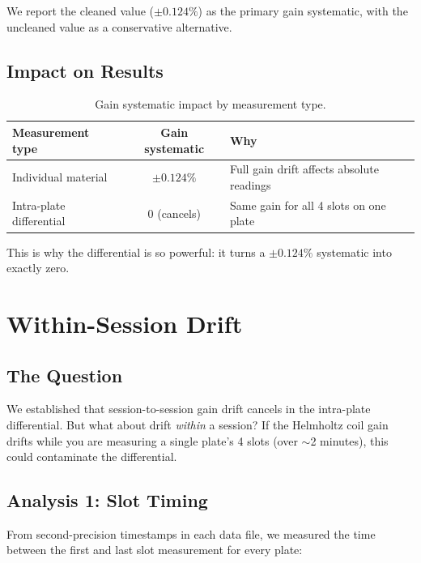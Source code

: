 \documentclass[11pt,letterpaper]{article}
\begin{document}
We report the cleaned value ($\pm 0.124\%$) as the primary gain systematic, with
the uncleaned value as a conservative alternative.

\subsection{Impact on Results}

\begin{table}[htbp]
\centering
\caption{Gain systematic impact by measurement type.}
\label{tab:gain-impact}
\begin{tabular}{@{}lcp{6cm}@{}}
\toprule
Measurement type & Gain systematic & Why \\
\midrule
Individual material       & $\pm 0.124\%$     & Full gain drift affects absolute readings \\
Intra-plate differential  & 0 (cancels)       & Same gain for all 4 slots on one plate \\
\bottomrule
\end{tabular}
\end{table}

This is why the differential is so powerful: it turns a $\pm 0.124\%$ systematic
into exactly zero.


\section{Within-Session Drift}
\label{sec:wsd}

\subsection{The Question}

We established that session-to-session gain drift cancels in the intra-plate
differential. But what about drift \emph{within} a session? If the Helmholtz
coil gain drifts while you are measuring a single plate's 4 slots (over
${\sim}$2 minutes), this could contaminate the differential.

\subsection{Analysis 1: Slot Timing}

From second-precision timestamps in each data file, we measured the time between
the first and last slot measurement for every plate:
\end{document}
